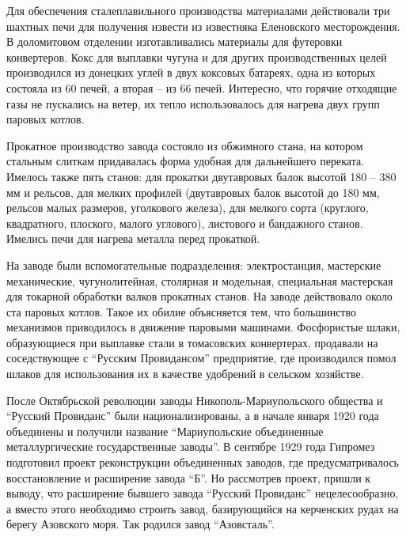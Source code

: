 Для обеспечения сталеплавильного производства материалами действовали три
шахтных печи для получения извести из известняка Еленовского месторождения. В
доломитовом отделении изготавливались материалы для футеровки конвертеров. Кокс
для выплавки чугуна и для других производственных целей производился из
донецких углей в двух коксовых батареях, одна из которых состояла из 60 печей,
а вторая – из 66 печей. Интересно, что горячие отходящие газы не пускались на
ветер, их тепло использовалось для нагрева двух групп паровых котлов.

Прокатное производство завода состояло из обжимного стана, на котором стальным
слиткам придавалась форма удобная для дальнейшего переката. Имелось также пять
станов: для прокатки  двутавровых балок высотой 180 – 380 мм и рельсов, для
мелких профилей (двутавровых балок высотой до 180 мм, рельсов малых размеров,
уголкового железа), для мелкого сорта (круглого, квадратного, плоского, малого
углового), листового и бандажного станов. Имелись печи для нагрева металла
перед прокаткой.

На заводе были вспомогательные  подразделения: электростанция, мастерские
механические, чугунолитейная, столярная и модельная, специальная мастерская
для токарной обработки валков прокатных станов. На заводе действовало около
ста паровых котлов. Такое их обилие объясняется тем, что большинство
механизмов приводилось в движение паровыми машинами. Фосфористые шлаки,
образующиеся при выплавке стали в томасовских конвертерах, продавали на
соседствующее с \enquote{Русским Провидансом} предприятие, где производился помол
шлаков для использования их в качестве удобрений в сельском хозяйстве.

После Октябрьской революции заводы Никополь-Мариупольского общества и \enquote{Русский
Провиданс} были национализированы, а в начале января 1920 года объединены и
получили название \enquote{Мариупольские объединенные металлургические государственные
заводы}. В сентябре 1929 года Гипромез подготовил проект  реконструкции
объединенных заводов, где предусматривалось восстановление и расширение завода
\enquote{Б}. Но рассмотрев проект, пришли к выводу, что расширение бывшего завода
\enquote{Русский Провиданс} нецелесообразно, а вместо этого необходимо строить завод,
базирующийся на керченских рудах на берегу Азовского моря. Так родился завод
\enquote{Азовсталь}.
